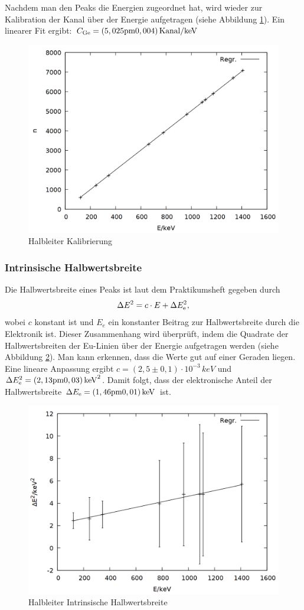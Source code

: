 Nachdem man den Peaks die Energien zugeordnet hat, wird wieder zur Kalibration der Kanal über der Energie aufgetragen (siehe Abbildung \ref{fig:ge_gauge}). Ein linearer Fit ergibt: $C\ind{Ge} = \si{(5,025\pm 0,004)\,Kanal/keV}$

\begin{figure}[h]
\centering
\includegraphics[width=0.7\linewidth]{data/ge_gauge.png}
\caption{Halbleiter Kalibrierung}
\label{fig:ge_gauge}
\end{figure}

\subsubsection*{Intrinsische Halbwertsbreite}
Die Halbwertsbreite eines Peaks ist laut dem Praktikumsheft \cite{praktikumsheft} gegeben durch
\begin{align*}
\Delta E^2 = c \cdot E + \Delta E\ind{e}^2,
\end{align*}
wobei $c$ konstant ist und $E_e$ ein konstanter Beitrag zur Halbwertsbreite durch die Elektronik ist.
Dieser Zusammenhang wird überprüft, indem die Quadrate der Halbwertsbreiten der Eu-Linien über der Energie aufgetragen werden (siehe Abbildung \ref{fig:ge_intrinsic}). Man kann erkennen, dass die Werte gut auf einer Geraden liegen. Eine lineare Anpassung ergibt $c = \si{(2,5 \pm 0,1)\cdot 10^{-3}\,keV}$ und $\Delta E\ind{e}^2 = \si{(2,13 \pm 0,03)\,keV^2}$. Damit folgt, dass der elektronische Anteil der Halbwertsbreite $\Delta E\ind{e} = \si{(1,46 \pm 0,01)\,keV}$ ist.

\begin{figure}
\centering
\includegraphics[width=0.7\linewidth]{data/ge_intrinsic.png}
\caption{Halbleiter Intrinsische Halbwertsbreite}
\label{fig:ge_intrinsic}
\end{figure}


